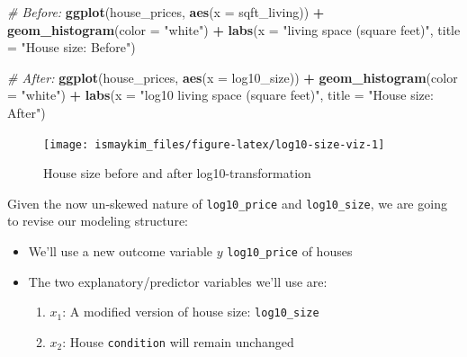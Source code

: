 \documentclass[12pt, krantz2,]{krantz}
\makeatletter
\newenvironment{Shaded}{\begin{snugshade}}{\end{snugshade}}
\newcommand{\CommentTok}[1]{\textcolor[rgb]{0.37,0.37,0.37}{\textit{#1}}}
\newcommand{\DataTypeTok}[1]{\textcolor[rgb]{0.27,0.27,0.27}{#1}}
\newcommand{\KeywordTok}[1]{\textcolor[rgb]{0.27,0.27,0.27}{\textbf{#1}}}
\newcommand{\NormalTok}[1]{#1}
\newcommand{\OperatorTok}[1]{\textcolor[rgb]{0.43,0.43,0.43}{\textbf{#1}}}
\newcommand{\StringTok}[1]{\textcolor[rgb]{0.5,0.5,0.5}{#1}}
\providecommand{\tightlist}{%
  \setlength{\itemsep}{0pt}\setlength{\parskip}{0pt}}
\newenvironment{kframe}{%
\medskip{}
\setlength{\fboxsep}{.8em}
 \def\at@end@of@kframe{}%
 \ifinner\ifhmode%
  \def\at@end@of@kframe{\end{minipage}}%
  \begin{minipage}{\columnwidth}%
 \fi\fi%
 \def\FrameCommand##1{\hskip\@totalleftmargin \hskip-\fboxsep
 \colorbox{shadecolor}{##1}\hskip-\fboxsep
     \hskip-\linewidth \hskip-\@totalleftmargin \hskip\columnwidth}%
 \MakeFramed {\advance\hsize-\width
   \@totalleftmargin\z@ \linewidth\hsize
   \@setminipage}}%
 {\par\unskip\endMakeFramed%
 \at@end@of@kframe}
\renewenvironment{Shaded}{\begin{kframe}}{\end{kframe}}
\makeatother
\begin{document}
\begin{Shaded}
\begin{Highlighting}[]
\CommentTok{# Before:}
\KeywordTok{ggplot}\NormalTok{(house_prices, }\KeywordTok{aes}\NormalTok{(}\DataTypeTok{x =}\NormalTok{ sqft_living)) }\OperatorTok{+}
\StringTok{  }\KeywordTok{geom_histogram}\NormalTok{(}\DataTypeTok{color =} \StringTok{"white"}\NormalTok{) }\OperatorTok{+}
\StringTok{  }\KeywordTok{labs}\NormalTok{(}\DataTypeTok{x =} \StringTok{"living space (square feet)"}\NormalTok{, }\DataTypeTok{title =} \StringTok{"House size: Before"}\NormalTok{)}

\CommentTok{# After:}
\KeywordTok{ggplot}\NormalTok{(house_prices, }\KeywordTok{aes}\NormalTok{(}\DataTypeTok{x =}\NormalTok{ log10_size)) }\OperatorTok{+}
\StringTok{  }\KeywordTok{geom_histogram}\NormalTok{(}\DataTypeTok{color =} \StringTok{"white"}\NormalTok{) }\OperatorTok{+}
\StringTok{  }\KeywordTok{labs}\NormalTok{(}\DataTypeTok{x =} \StringTok{"log10 living space (square feet)"}\NormalTok{, }\DataTypeTok{title =} \StringTok{"House size: After"}\NormalTok{)}
\end{Highlighting}
\end{Shaded}

\begin{figure}

{\centering \texttt{[image: ismaykim\_files/figure-latex/log10-size-viz-1]} 

}

\caption{House size before and after log10-transformation}\label{fig:log10-size-viz}
\end{figure}

Given the now un-skewed nature of \texttt{log10\_price} and \texttt{log10\_size}, we are going to revise our modeling structure:

\begin{itemize}
\tightlist
\item
  We'll use a new outcome variable \(y\) \texttt{log10\_price} of houses
\item
  The two explanatory/predictor variables we'll use are:

  \begin{enumerate}
  \def\labelenumi{\arabic{enumi}.}
  \tightlist
  \item
    \(x_1\): A modified version of house size: \texttt{log10\_size}
  \item
    \(x_2\): House \texttt{condition} will remain unchanged
  \end{enumerate}
\end{itemize}
\end{document}
